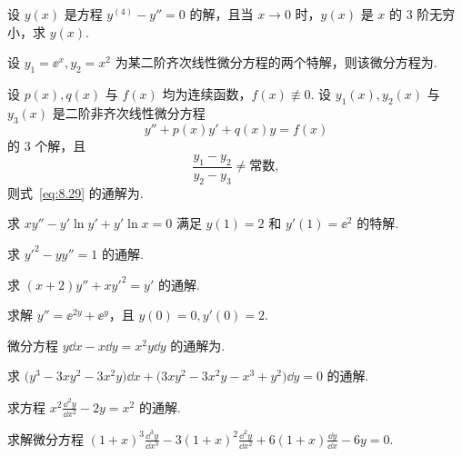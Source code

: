 	\begin{ti}
		设 $y(x)$ 是方程 $y^{(4)} - y'' = 0$ 的解，且当 $x \to 0$ 时，$y(x)$ 是 $x$ 的 $3$ 阶无穷小，求 $y(x)$.
	\end{ti}

	\begin{ti}
		设 $y_{1} = \ee^{x}, y_{2} = x^{2}$ 为某二阶齐次线性微分方程的两个特解，则该微分方程为\htwo.
	\end{ti}

	\begin{ti}
		设 $p(x), q(x)$ 与 $f(x)$ 均为连续函数，$f(x) \not\equiv 0$. 设 $y_{1}(x),y_{2}(x)$ 与 $y_{3}(x)$ 是二阶非齐次线性微分方程
		\begin{equation}\label{eq:8.29}
			y'' + p(x)y' + q(x)y = f(x)
		\end{equation}
		的 $3$ 个解，且
		\[
			\frac{y_{1} - y_{2}}{y_{2} - y_{3}} \ne \text{常数},
		\]
		则式~\eqref{eq:8.29} 的通解为\htwo.
	\end{ti}

	\begin{ti}
		求 $xy'' - y'\ln y' + y'\ln x = 0$ 满足 $y(1) = 2$ 和 $y'(1) = \ee^{2}$ 的特解.
	\end{ti}

	\begin{ti}
		求 $y'^{2} - yy'' = 1$ 的通解.
	\end{ti}

	\begin{ti}
		求 $(x + 2)y'' + xy'^{2} = y'$ 的通解.
	\end{ti}

	\begin{ti}
		求解 $y'' = \ee^{2y} + \ee^{y}$，且 $y(0) = 0,y'(0) = 2$.
	\end{ti}

	\begin{ti}
		微分方程 $y \dd{x} - x \dd{y} = x^{2} y \dd{y}$ 的通解为\htwo.
	\end{ti}

	\begin{ti}
		求 $\bigl( y^{3} - 3xy^{2} - 3x^{2}y \bigr) \dd{x} + \bigl( 3xy^{2} - 3x^{2}y - x^{3} + y^{2} \bigr) \dd{y} = 0$ 的通解.
	\end{ti}

	\begin{ti}
		求方程 $x^{2} \frac{\dd^{2}y}{\dd{x^{2}}} - 2y = x^{2}$ 的通解.
	\end{ti}

	\begin{ti}
		求解微分方程 $(1 + x)^{3} \frac{\dd^{3}y}{\dd{x^{3}}} - 3(1 + x)^{2} \frac{\dd^{2}y}{\dd{x^{2}}} + 6(1 + x) \frac{\dd{y}}{\dd{x}} - 6y = 0$.
	\end{ti}

